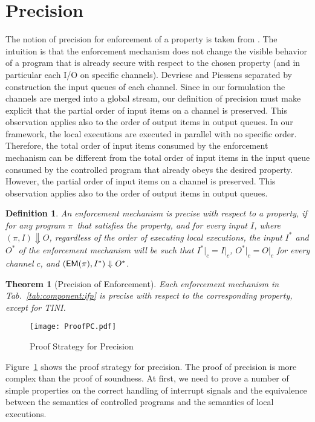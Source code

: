 \documentclass[10pt,a4paper,oneside]{article}
\newtheorem{definition}{Definition}[section]
\newtheorem{theorem}{Theorem}[section]
\def\execution#1#2#3{\ensuremath{(#1, #2)\Downarrow#3}}
\def\channeleq#1#2#3{\ensuremath{\restrict{#1}{#3} = \restrict{#2}{#3}}}
\def\restrict#1#2{\ensuremath{{#1}|_{#2}}}
\def\chnl{\ensuremath{c}}
\def\sanserif#1{\ensuremath{\sf #1}}
\def\EM{\ensuremath{{\sanserif{EM}}}}
\def\Prog{\ensuremath{\pi}}
\def\EMP{\ensuremath{\EM(}\ensuremath{\Prog)}}
\begin{document}
\section{Precision} \label{sec:precision}
The notion of precision for enforcement of a property is taken from \cite{Devr-Pies-10-IEEESP,DeGroef-etal-12-CCS}. The intuition is that the enforcement mechanism does not change the visible behavior of a program that is already secure with respect to the chosen property (and in particular each I/O on specific channels). Devriese and Piessens separated by construction the input queues of each channel. Since in our formulation the channels are merged into a global stream, our definition of precision must make explicit that the partial order of input items on a channel is preserved. This observation applies also to the order of output items in output queues. In our framework, the local executions are executed in parallel with no specific order. Therefore, the total order of input items consumed by the enforcement mechanism can be different from  the total order of input items in the input queue consumed by the controlled program that already obeys the desired property. However, the partial order of input items on a channel is preserved. This observation applies also to the order of output items in output queues.

\begin{definition}\label{def:precision}
An enforcement mechanism is \emph{precise} with respect to a property, if for any program \Prog\ that satisfies the property, and for every input $I$, where \execution{\Prog}{I}{O}, regardless of the order of executing local executions, the input $I^*$ and $O^*$ of the enforcement mechanism will be such that \channeleq{I^*}{I}{\chnl}, \channeleq{O^*}{O}{\chnl} for every channel \chnl, and \execution{\EMP}{I^*}{O^*}.
\end{definition}


\begin{theorem}[Precision of Enforcement] \label{thm:precision}
	Each enforcement mechanism in Tab.~\ref{tab:component:ifp} is precise with respect to the corresponding property, except for TINI.
\end{theorem}

\begin{figure}
\centering
\texttt{[image: ProofPC.pdf]}
\caption{Proof Strategy for Precision}
\label{fig:proof:PC}
\end{figure}


Figure~\ref{fig:proof:PC} shows the proof strategy for precision.
The proof of precision is more complex than the proof of soundness. At first, we need to prove a number of simple properties on the correct handling of interrupt signals and the equivalence between the semantics of controlled programs and the semantics of local executions.
\end{document}
